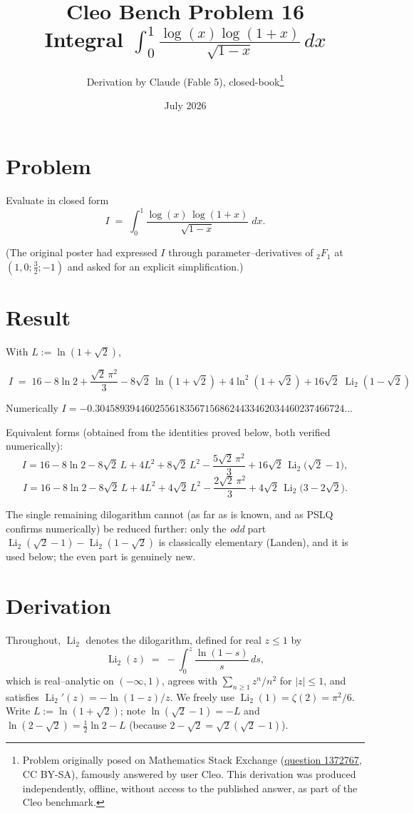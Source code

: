 \documentclass[11pt]{article}
\title{Cleo Bench Problem 16\\[1ex]\large Integral $\int_0^1\frac{\log(x)\log(1+x)}{\sqrt{1-x}}\,dx$}
\author{Derivation by Claude (Fable 5), closed-book\thanks{Problem originally
posed on Mathematics Stack Exchange
(\href{https://math.stackexchange.com/q/1372767}{question 1372767}, CC BY-SA),
famously answered by user Cleo. This derivation was produced independently,
offline, without access to the published answer, as part of the Cleo benchmark.}}
\date{July 2026}
\theoremstyle{remark}
\begin{document}
\maketitle
\sloppy

\section*{Problem}

Evaluate in closed form
$$I \;=\; \int_0^1 \frac{\log(x)\,\log(1+x)}{\sqrt{1-x}}\;dx .$$

(The original poster had expressed $I$ through parameter--derivatives of ${}_2F_1$ at $(1,0;\tfrac32;-1)$ and asked for an explicit simplification.)

\section*{Result}

With $L:=\ln\!\left(1+\sqrt{2}\right)$,

$$\boxed{\;I \;=\; 16-8\ln 2+\frac{\sqrt{2}\,\pi^{2}}{3}-8\sqrt{2}\,\ln\!\left(1+\sqrt{2}\right)+4\ln^{2}\!\left(1+\sqrt{2}\right)+16\sqrt{2}\;\operatorname{Li}_{2}\!\left(1-\sqrt{2}\right)\;}$$

Numerically $I=-0.30458939446025561835671568624433462034460237466724\ldots$

Equivalent forms (obtained from the identities proved below, both verified numerically):
$$I=16-8\ln 2-8\sqrt2\,L+4L^{2}+8\sqrt2\,L^{2}-\frac{5\sqrt2\,\pi^{2}}{3}+16\sqrt2\,\operatorname{Li}_2\!\big(\sqrt2-1\big),$$
$$I=16-8\ln 2-8\sqrt2\,L+4L^{2}+4\sqrt2\,L^{2}-\frac{2\sqrt2\,\pi^{2}}{3}+4\sqrt2\,\operatorname{Li}_2\!\big(3-2\sqrt2\big).$$

The single remaining dilogarithm cannot (as far as is known, and as PSLQ confirms numerically) be reduced further: only the \emph{odd} part $\operatorname{Li}_2(\sqrt2-1)-\operatorname{Li}_2(1-\sqrt2)$ is classically elementary (Landen), and it is used below; the even part is genuinely new.

\section*{Derivation}

Throughout, $\operatorname{Li}_2$ denotes the dilogarithm, defined for real $z\le 1$ by
$$\operatorname{Li}_2(z)\;=\;-\int_0^z \frac{\ln(1-s)}{s}\,ds ,$$
which is real--analytic on $(-\infty,1)$, agrees with $\sum_{n\ge1}z^n/n^2$ for $|z|\le 1$, and satisfies $\operatorname{Li}_2'(z)=-\ln(1-z)/z$. We freely use $\operatorname{Li}_2(1)=\zeta(2)=\pi^2/6$. Write $L:=\ln(1+\sqrt2)$; note $\ln(\sqrt2-1)=-L$ and $\ln(2-\sqrt2)=\tfrac12\ln2-L$ (because $2-\sqrt2=\sqrt2(\sqrt2-1)$).
\end{document}
